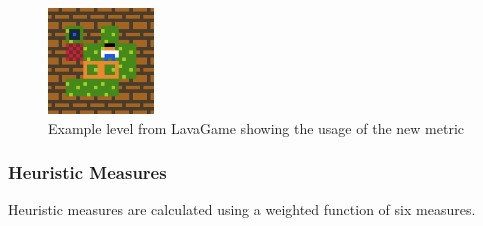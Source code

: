 \documentclass[letterpaper]{article}
\begin{document}
\begin{figure}
  	\centering
    \includegraphics[width=0.25\textwidth]{Images/lavaGame}
    \caption{Example level from LavaGame showing the usage of the new metric}
    \label{Figure:lavaGame}
\end{figure}

\subsubsection{Heuristic Measures}
Heuristic measures are calculated using a weighted function of six measures.
\end{document}
